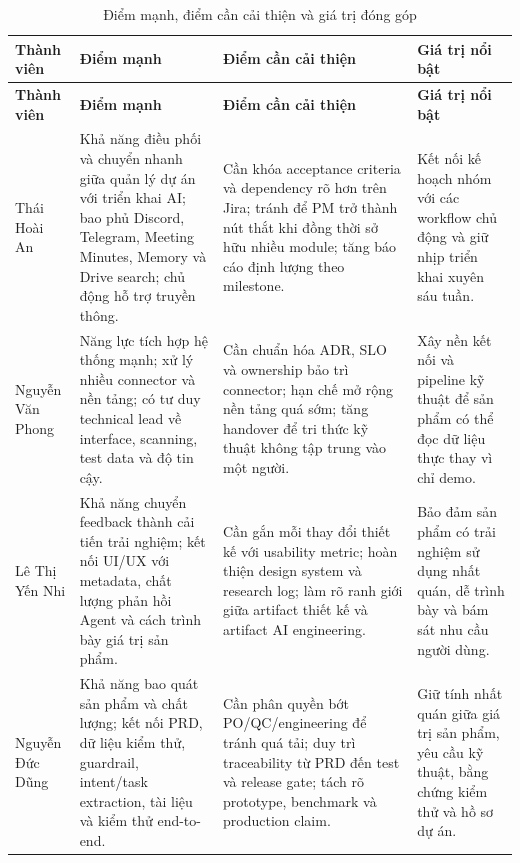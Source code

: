 \documentclass[12pt,a4paper]{article}
\begin{document}
\setlength{\tabcolsep}{4pt}
\begin{longtable}{@{}P{2.4cm}P{4.5cm}P{4.5cm}P{4.0cm}@{}}
\caption{Điểm mạnh, điểm cần cải thiện và giá trị đóng góp}
\label{tab:member-assessment}\\
\color{white}\textbf{Thành viên} & \color{white}\textbf{Điểm mạnh} &
\color{white}\textbf{Điểm cần cải thiện} & \color{white}\textbf{Giá trị nổi bật}\\
\toprule
\endfirsthead
{}
\color{white}\textbf{Thành viên} & \color{white}\textbf{Điểm mạnh} &
\color{white}\textbf{Điểm cần cải thiện} & \color{white}\textbf{Giá trị nổi bật}\\
\toprule
\endhead
\bottomrule
\endlastfoot

Thái Hoài An &
Khả năng điều phối và chuyển nhanh giữa quản lý dự án với triển khai AI; bao phủ
Discord, Telegram, Meeting Minutes, Memory và Drive search; chủ động hỗ trợ truyền thông. &
Cần khóa acceptance criteria và dependency rõ hơn trên Jira; tránh để PM trở thành
nút thắt khi đồng thời sở hữu nhiều module; tăng báo cáo định lượng theo milestone. &
Kết nối kế hoạch nhóm với các workflow chủ động và giữ nhịp triển khai xuyên sáu tuần.\\

Nguyễn Văn Phong &
Năng lực tích hợp hệ thống mạnh; xử lý nhiều connector và nền tảng; có tư duy
technical lead về interface, scanning, test data và độ tin cậy. &
Cần chuẩn hóa ADR, SLO và ownership bảo trì connector; hạn chế mở rộng nền tảng
quá sớm; tăng handover để tri thức kỹ thuật không tập trung vào một người. &
Xây nền kết nối và pipeline kỹ thuật để sản phẩm có thể đọc dữ liệu thực thay vì chỉ demo.\\

Lê Thị Yến Nhi &
Khả năng chuyển feedback thành cải tiến trải nghiệm; kết nối UI/UX với metadata,
chất lượng phản hồi Agent và cách trình bày giá trị sản phẩm. &
Cần gắn mỗi thay đổi thiết kế với usability metric; hoàn thiện design system và
research log; làm rõ ranh giới giữa artifact thiết kế và artifact AI engineering. &
Bảo đảm sản phẩm có trải nghiệm sử dụng nhất quán, dễ trình bày và bám sát nhu cầu người dùng.\\

Nguyễn Đức Dũng &
Khả năng bao quát sản phẩm và chất lượng; kết nối PRD, dữ liệu kiểm thử, guardrail,
intent/task extraction, tài liệu và kiểm thử end-to-end. &
Cần phân quyền bớt PO/QC/engineering để tránh quá tải; duy trì traceability từ PRD
đến test và release gate; tách rõ prototype, benchmark và production claim. &
Giữ tính nhất quán giữa giá trị sản phẩm, yêu cầu kỹ thuật, bằng chứng kiểm thử và hồ sơ dự án.\\
\end{longtable}
\end{document}
